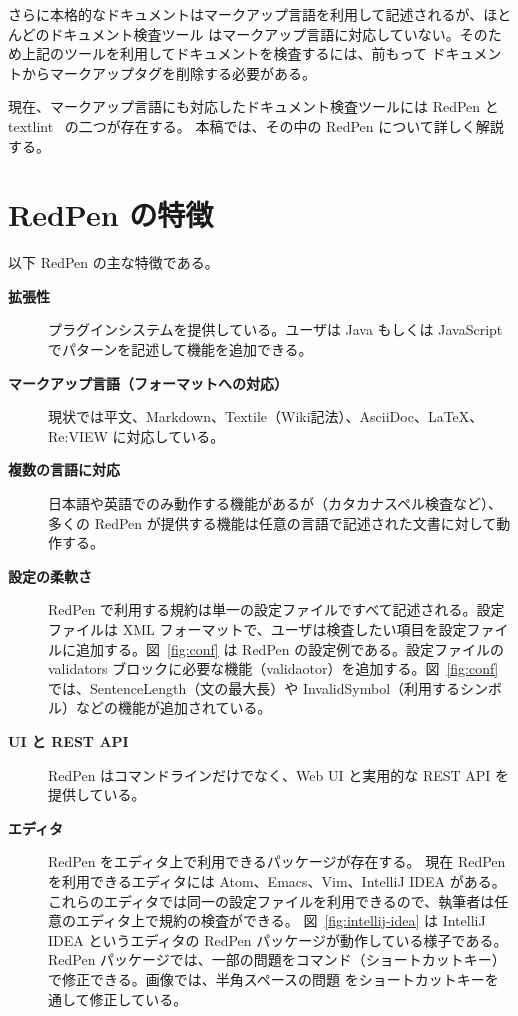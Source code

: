 さらに本格的なドキュメントはマークアップ言語を利用して記述されるが、ほとんどのドキュメント検査ツール
はマークアップ言語に対応していない。そのため上記のツールを利用してドキュメントを検査するには、前もって
ドキュメントからマークアップタグを削除する必要がある。

現在、マークアップ言語にも対応したドキュメント検査ツールには RedPen と textlint~\cite{textlint} の二つが存在する。
本稿では、その中の RedPen について詳しく解説する。

\section{RedPen の特徴}

以下 RedPen の主な特徴である。

\begin{description}
\item[{\bf 拡張性}]
  プラグインシステムを提供している。ユーザは Java もしくは JavaScript でパターンを記述して機能を追加できる。

\item[{\bf マークアップ言語（フォーマットへの対応）}]
  現状では平文、Markdown、Textile（Wiki記法）、AsciiDoc、LaTeX、Re:VIEW に対応している。

\item[{\bf 複数の言語に対応}]
  日本語や英語でのみ動作する機能があるが（カタカナスペル検査など）、多くの RedPen が提供する機能は任意の言語で記述された文書に対して動作する。

\item[{\bf 設定の柔軟さ}]
  RedPen で利用する規約は単一の設定ファイルですべて記述される。設定ファイルは XML フォーマットで、ユーザは検査したい項目を設定ファイルに追加する。図~\ref{fig:conf} は RedPen の設定例である。設定ファイルの validators ブロックに必要な機能（validaotor）を追加する。図~\ref{fig:conf} では、SentenceLength（文の最大長）や InvalidSymbol（利用するシンボル）などの機能が追加されている。

\item[{\bf UI と REST API}]
  RedPen はコマンドラインだけでなく、Web UI と実用的な REST API を提供している。

\item[{\bf エディタ}]
  RedPen をエディタ上で利用できるパッケージが存在する。
  現在 RedPen を利用できるエディタには Atom、Emacs、Vim、IntelliJ IDEA がある。
  これらのエディタでは同一の設定ファイルを利用できるので、執筆者は任意のエディタ上で規約の検査ができる。
  図~\ref{fig:intellij-idea} は IntelliJ IDEA というエディタの RedPen パッケージが動作している様子である。
  RedPen パッケージでは、一部の問題をコマンド（ショートカットキー）で修正できる。画像では、半角スペースの問題
  をショートカットキーを通して修正している。
\end{description}

